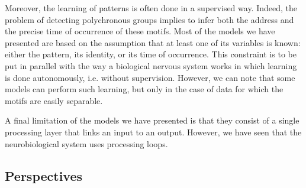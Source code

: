\documentclass[brainsci, %
               review,submit,pdftex,moreauthors
               ]{Definitions/mdpi}
\begin{document}
Moreover, the learning of patterns is often done in a supervised way. Indeed, the problem of detecting polychronous groups implies to infer both the address and the precise time of occurrence of these motifs. Most of the models we have presented are based on the assumption that at least one of its variables is known: either the pattern, its identity, or its time of occurrence. This constraint is to be put in parallel with the way a biological nervous system works in which learning is done autonomously, i.e. without supervision. However, we can note that some models can perform such learning, but only in the case of data for which the motifs are easily separable.

A final limitation of the models we have presented is that they consist of a single processing layer that links an input to an output. However, we have seen that the neurobiological system uses processing loops.









\subsection{Perspectives}
\end{document}
